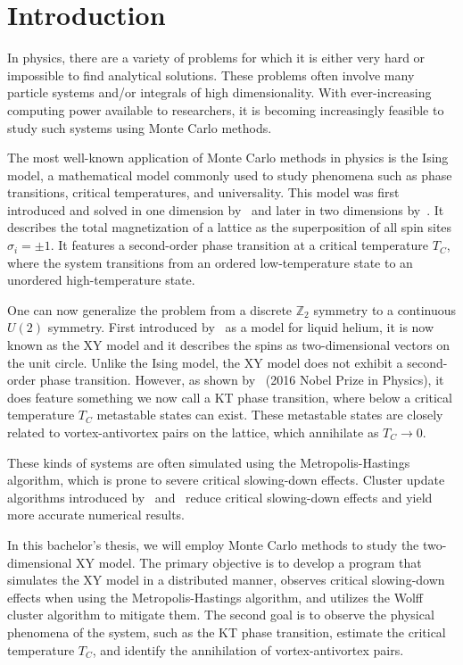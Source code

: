 \chapter{Introduction}\label{chap:introduction}
	In physics, there are a variety of problems for which it is either very hard or impossible to find analytical solutions. These problems often involve many particle systems and/or integrals of high dimensionality. With ever-increasing computing power available to researchers, it is becoming increasingly feasible to study such systems using Monte Carlo methods.
	
	The most well-known application of Monte Carlo methods in physics is the Ising model, a mathematical model commonly used to study phenomena such as phase transitions, critical temperatures, and universality. This model was first introduced and solved in one dimension by~\cite{ising} and later in two dimensions by~\cite{onsager}. It describes the total magnetization of a lattice as the superposition of all spin sites $\sigma_i = \pm 1$. It features a second-order phase transition at a critical temperature $T_C$, where the system transitions from an ordered low-temperature state to an unordered high-temperature state.
	
	One can now generalize the problem from a discrete $\mathbb{Z}_2$ symmetry to a continuous $U(2)$ symmetry. First introduced by~\cite{matsubara} as a model for liquid helium, it is now known as the XY model and it describes the spins as two-dimensional vectors on the unit circle. Unlike the Ising model, the XY model does not exhibit a second-order phase transition. However, as shown by~\cite{kosterlitz} (2016 Nobel Prize in Physics), it does feature something we now call a KT phase transition, where below a critical temperature $T_C$ metastable states can exist. These metastable states are closely related to vortex-antivortex pairs on the lattice, which annihilate as $T_C \rightarrow 0$.
	
	These kinds of systems are often simulated using the Metropolis-Hastings algorithm, which is prone to severe critical slowing-down effects. Cluster update algorithms introduced by~\cite{sw} and~\cite{wolff} reduce critical slowing-down effects and yield more accurate numerical results.
	
	In this bachelor's thesis, we will employ Monte Carlo methods to study the two-dimensional XY model. The primary objective is to develop a program that simulates the XY model in a distributed manner, observes critical slowing-down effects when using the Metropolis-Hastings algorithm, and utilizes the Wolff cluster algorithm to mitigate them. The second goal is to observe the physical phenomena of the system, such as the KT phase transition, estimate the critical temperature $T_C$, and identify the annihilation of vortex-antivortex pairs.
	